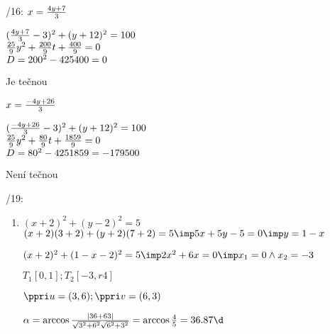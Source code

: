 /16:
$x = \frac{4y+7}3$

$(\frac{4y+7}3-3)^2 + (y+12)^2 = 100$\\
$\frac{25}9 y^2 + \frac{200}9 t + \frac{400}{9} =0$\\
$ D  = 200^2 - 4 \* 25 \* 400 = 0 $

Je tečnou

$x = \frac{-4y+26}3$

$(\frac{-4y+26}3-3)^2 + (y+12)^2 = 100$\\
$\frac{25}9 y^2 + \frac{80}9 t + \frac{1859}{9} =0$\\
$ D  = 80^2 - 4 \* 25 \* 1859 = -179500 $
 
 Není tečnou

 /19:

 \begin{enumerate}
	 \item $(x+2)^2 + (y-2)^2 = 5$
		 $(x+2)(3+2) + (y+2)(7+2) = 5 \imp 5x+5y-5 = 0 \imp y = 1-x$

		 $(x+2)^2 + (1-x-2)^2 = 5 \imp 2x^2+6x=0 \imp x_1 = 0 \land x_2  = -3$

		 $T_1[0,1];T_2[-3,r4]$

		 $\ve u= (3,6); \ve v = (6,3)$

		 $\alpha = \arccos \f{|3\*6+6\*3|}{\sqrt{3^2 + 6^2}\*\sqrt{6^2+3^2}} = \arccos \f 45 = 36.87 \d$
 \end{enumerate}




\EndDoc
